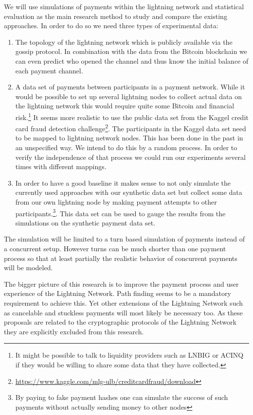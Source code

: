 \documentclass[a4paper]{paper}
\begin{document}
We will use simulations of payments within the lightning network and statistical evaluation as the main research method to study and compare the existing approaches.
In order to do so we need three types of experimental data:
\begin{enumerate}
\item The topology of the lightning network which is publicly available via the gossip protocol. In combination with the data from the Bitcoin blockchain we can even predict who opened the channel and thus know the initial balance of each payment channel.
\item A data set of payments between participants in a payment network. While it would be possible to set up several lightning nodes to collect actual data on the lightning network this would require quite some Bitcoin and financial risk.\footnote{It might be possible to talk to liquidity providers such as LNBIG or ACINQ if they would be willing to share some data that they have collected.} It seems more realistic to use the public data set from the Kaggel credit card fraud detection challenge\footnote{\url{https://www.kaggle.com/mlg-ulb/creditcardfraud/download}}. The participants in the Kaggel data set need to be mapped to lightning network nodes. This has been done in the past \cite{sivaraman2018routing} in an unspecified way. We intend to do this by a random process. In order to verify the independence of that process we could run our experiments several times with different mappings. 
\item In order to have a good baseline it makes sense to not only simulate the currently used approaches with our synthetic data set but collect some data from our own lightning node by making payment attempts to other participants.\footnote{By paying to fake payment hashes one can simulate the success of such payments without actually sending money to other nodes}. This data set can be used to gauge the results from the simulations on the synthetic payment data set.
\end{enumerate}

The simulation will be limited to a turn based simulation of payments instead of a concurrent setup.
However turns can be much shorter than one payment process so that at least partially the realistic behavior of concurrent payments will be modeled. 

The bigger picture of this research is to improve the payment process and user experience of the Lightning Network.
Path finding seems to be a mandatory requirement to achieve this.
Yet other extensions of the Lightning Network such as cancelable and stuckless payments\cite{gondo2019stucklss} will most likely be necessary too.
As these proposals are related to the cryptographic protocols of the Lightning Network they are explicitly excluded from this research.
\end{document}
